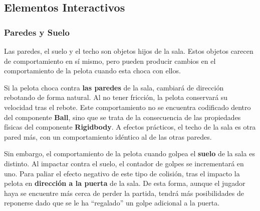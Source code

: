 \subsection{Elementos Interactivos}
\subsubsection{Paredes y Suelo}
Las paredes, el suelo y el techo son objetos hijos de la sala. Estos objetos carecen de comportamiento en sí mismo, pero pueden producir cambios en el comportamiento de la pelota cuando esta choca con ellos.

Si la pelota choca contra \textbf{las paredes} de la sala, cambiará de dirección rebotando de forma natural. Al no tener fricción, la pelota conservará su velocidad tras el rebote. Este comportamiento no se encuentra codificado dentro del componente \textbf{Ball}, sino que se trata de la consecuencia de las propiedades físicas del componente \textbf{Rigidbody}. A efectos prácticos, el techo de la sala es otra pared más, con un comportamiento idéntico al de las otras paredes.

Sin embargo, el comportamiento de la pelota cuando golpea el \textbf{suelo} de la sala es distinto. Al impactar contra el suelo, el contador de golpes se incrementará en uno. Para paliar el efecto negativo de este tipo de colisión, tras el impacto la pelota en \textbf{dirección a la puerta} de la sala. De esta forma, aunque el jugador haya se encuentre más cerca de perder la partida, tendrá más posibilidades de reponerse dado que se le ha ``regalado'' un golpe adicional  a la puerta. 

